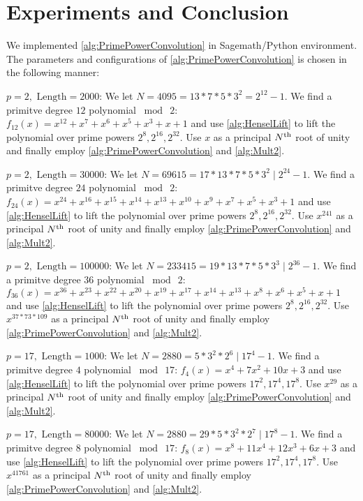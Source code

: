\section{Experiments and Conclusion}
We implemented \cref{alg:PrimePowerConvolution} in Sagemath/Python \cite{OTHER:Stein05} environment. The parameters and configurations of \cref{alg:PrimePowerConvolution} is chosen in the following manner:

{\bf \(p = 2, \text{ Length} = 2000\)}: We let \(N = 4095 = 13 * 7 * 5 * 3^2 = 2^{12} - 1\). We find a primitve degree \(12\) polynomial \(\bmod \  2\): \(f_{12}(x) = x^{12} + x^7 + x^6 + x^5 + x^3 + x + 1\) and use \cref{alg:HenselLift} to lift the polynomial over prime powers \(2^8, 2^{16}, 2^{32}\). Use \(x\) as a principal \(N\textsuperscript{th}\) root of unity and finally employ \cref{alg:PrimePowerConvolution} and \cref{alg:Mult2}.

{\bf \(p = 2, \text{ Length} = 30000\)}: We let \(N = 69615 = 17 * 13 * 7 * 5 * 3^2 \mid 2^{24} - 1\). We find a primitve degree \(24\) polynomial \(\bmod \  2\): \(f_{24}(x) = x^{24} + x^{16} + x^{15} + x^{14} + x^{13} + x^{10} + x^9 + x^7 + x^5 + x^3 + 1\) and use \cref{alg:HenselLift} to lift the polynomial over prime powers \(2^8, 2^{16}, 2^{32}\). Use \(x^{241} \) as a principal \(N\textsuperscript{th}\) root of unity and finally employ \cref{alg:PrimePowerConvolution} and \cref{alg:Mult2}.

{\bf \(p = 2, \text{ Length} = 100000\)}: We let \(N = 233415 = 19 * 13 * 7 * 5 * 3^3 \mid 2^{36} - 1\). We find a primitve degree \(36\) polynomial \(\bmod \  2\): \(f_{36}(x) = x^{36} + x^{23} + x^{22} + x^{20} + x^{19} + x^{17} + x^{14} + x^{13} + x^8 + x^6 + x^5 + x + 1\) and use \cref{alg:HenselLift} to lift the polynomial over prime powers \(2^8, 2^{16}, 2^{32}\). Use \(x^{37*73*109} \) as a principal \(N\textsuperscript{th}\) root of unity and finally employ \cref{alg:PrimePowerConvolution} and \cref{alg:Mult2}.

\ifFullVersion

{\bf \(p = 17, \text{ Length} = 1000\)}: We let \(N = 2880 = 5 * 3^2 * 2^6 \mid 17^{4} - 1\). We find a primitve degree \(4\) polynomial \(\bmod \  17\): \(f_{4}(x) = x^4 + 7x^2 + 10x + 3\) and use \cref{alg:HenselLift} to lift the polynomial over prime powers \(17^2, 17^4, 17^8\). Use \(x^{29} \) as a principal \(N\textsuperscript{th}\) root of unity and finally employ \cref{alg:PrimePowerConvolution} and \cref{alg:Mult2}.

{\bf \(p = 17, \text{ Length} = 80000\)}: We let \(N = 2880 = 29 * 5 * 3^2 * 2^7 \mid 17^{8} - 1\). We find a primitve degree \(8\) polynomial \(\bmod \  17\): \(f_{8}(x) = x^8 + 11x^4 + 12x^3 + 6x + 3\) and use \cref{alg:HenselLift} to lift the polynomial over prime powers \(17^2, 17^4, 17^8\). Use \(x^{41761} \) as a principal \(N\textsuperscript{th}\) root of unity and finally employ \cref{alg:PrimePowerConvolution} and \cref{alg:Mult2}.

